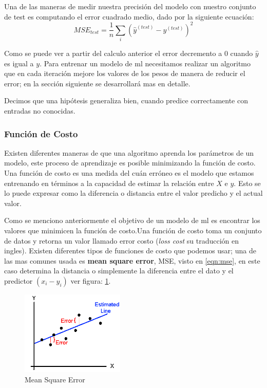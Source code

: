 Una de las maneras de medir nuestra precisión del modelo con nuestro conjunto de test es computando el error cuadrado medio, dado por la siguiente ecuación:
\begin{equation}\label{eqn:mse} 
MSE_{test} = \frac{1}{n}\sum_{i}(\hat{y}^(test)- y^(test))^2
\end{equation}

Como se puede ver a partir del calculo anterior el error decremento a 0 cuando $\hat{y}$ es igual a $y$. Para entrenar un modelo de \ac{ml} necesitamos realizar un algoritmo que en cada iteración mejore los valores de los pesos de manera de reducir el error; en la sección siguiente se desarrollará mas en detalle.

Decimos que una hipótesis generaliza bien, cuando predice correctamente con entradas no conocidas.

\subsubsection{Función de Costo}
Existen diferentes maneras de que una algoritmo aprenda los parámetros de un modelo, este proceso de aprendizaje es posible minimizando la función de costo. Una función de costo es una medida del cuán erróneo es el modelo que estamos entrenando en términos a la capacidad de estimar la relación entre $X $ e $y $. Esto se lo puede expresar como la diferencia o distancia entre el valor predicho y el actual valor.

Como se menciono anteriormente el objetivo de un modelo de \ac{ml} es encontrar los valores que minimicen la función de costo.Una función de costo toma un conjunto de datos y retorna un valor llamado error costo (\textit{loss cost} su traducción en ingles). Existen diferentes tipos de funciones de costo que podemos usar; una de las mas comunes usada es \textbf{mean square error}, MSE, visto en \ref{eqn:mse}, en este caso determina la distancia o simplemente la diferencia entre el dato y el predictor $(x_i - y_i) $ ver figura: \ref{Fig:mse}.
\begin{figure}[H] \centering
  \includegraphics[height=4cm,keepaspectratio=true,clip=true]{imagenes/MarcoTeorico/mse-cost.png}
  \caption{Mean Square Error }\label{Fig:mse}
\end{figure}

